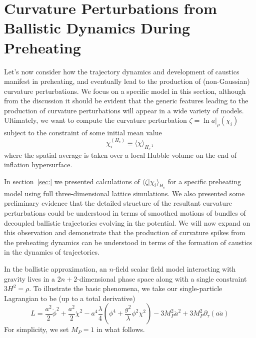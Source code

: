 \section{Curvature Perturbations from Ballistic Dynamics During Preheating}
Let's now consider how the trajectory dynamics and development of caustics manifest in preheating, and eventually lead to the production of (non-Gaussian) curvature perturbations.
We focus on a specific model in this section, although from the discussion it should be evident that the generic features leading to the production of curvature perturbations will appear in a wide variety of models.
Ultimately, we want to compute the curvature perturbation $\zeta = \ln a|_{\rho}(\chi_i)$ subject to the constraint of some initial mean value
\begin{equation}
  \chi_i^{(H_e)} \equiv \langle \chi \rangle_{H_e^{-1}}
\end{equation}
where the spatial average is taken over a local Hubble volume on the end of inflation hypersurface.

In section~\ref{sec:} we presented calculations of $\langle \zeta | \chi_i \rangle_{H_e}$ for a specific preheating model using full three-dimensional lattice simulations.
We also presented some preliminary evidence that the detailed structure of the resultant curvature perturbations could be understood in terms of smoothed motions of bundles of decoupled ballistic trajectories evolving in the potential.
We will now expand on this observation and demonstrate that the production of curvature spikes from the preheating dynamics can be understood in terms of the formation of caustics in the dynamics of trajectories.

In the ballistic approximation, an $n$-field scalar field model interacting with gravity lives in a $2n+2$-dimensional phase space along with a single constraint $3H^2 = \rho$.
To illustrate the basic phenomena, we take our single-particle Lagrangian to be (up to a total derivative)
\begin{equation}
  L = \frac{a^2}{2}\dot{\phi}^2 + \frac{a^2}{2}\dot{\chi}^2 - a^4\frac{\lambda}{4}\left(\phi^4 + \frac{g^2}{\lambda}\phi^2\chi^2\right) - 3M_P^2\dot{a}^2 + 3M_P^2\partial_\tau(a\dot{a})
\end{equation}
For simplicity, we set $M_P=1$ in what follows.

